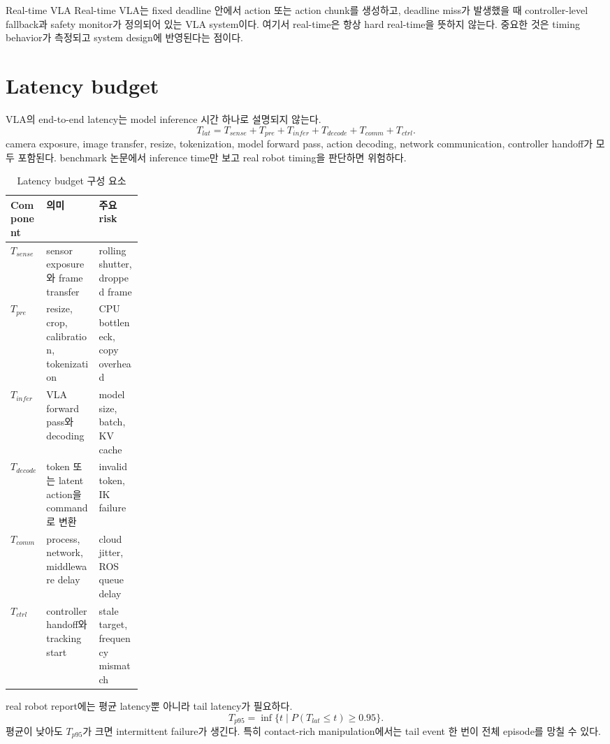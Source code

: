 \begin{definitionbox}{Real-time VLA}
Real-time VLA는 fixed deadline 안에서 action 또는 action chunk를 생성하고, deadline miss가 발생했을 때 controller-level fallback과 safety monitor가 정의되어 있는 VLA system이다. 여기서 real-time은 항상 hard real-time을 뜻하지 않는다. 중요한 것은 timing behavior가 측정되고 system design에 반영된다는 점이다.
\end{definitionbox}

\section{Latency budget}

VLA의 end-to-end latency는 model inference 시간 하나로 설명되지 않는다.
\begin{equation}
  T_{lat}
  =
  T_{sense}
  +
  T_{pre}
  +
  T_{infer}
  +
  T_{decode}
  +
  T_{comm}
  +
  T_{ctrl}.
  \label{eq:ch18-latency-budget}
\end{equation}
camera exposure, image transfer, resize, tokenization, model forward pass, action decoding, network communication, controller handoff가 모두 포함된다. benchmark 논문에서 inference time만 보고 real robot timing을 판단하면 위험하다.

\begin{table}[h]
  \centering
  \caption{Latency budget 구성 요소}
  \begin{tabularx}{\linewidth}{p{0.22\linewidth}X X}
    \toprule
    Component & 의미 & 주요 risk \\
    \midrule
    $T_{sense}$ & sensor exposure와 frame transfer & rolling shutter, dropped frame \\
    $T_{pre}$ & resize, crop, calibration, tokenization & CPU bottleneck, copy overhead \\
    $T_{infer}$ & VLA forward pass와 decoding & model size, batch, KV cache \\
    $T_{decode}$ & token 또는 latent action을 command로 변환 & invalid token, IK failure \\
    $T_{comm}$ & process, network, middleware delay & cloud jitter, ROS queue delay \\
    $T_{ctrl}$ & controller handoff와 tracking start & stale target, frequency mismatch \\
    \bottomrule
  \end{tabularx}
  \label{tab:ch18-latency-budget}
\end{table}

real robot report에는 평균 latency뿐 아니라 tail latency가 필요하다.
\begin{equation}
  T_{p95}
  =
  \inf
  \{t \mid P(T_{lat} \leq t) \geq 0.95\}.
  \label{eq:ch18-p95}
\end{equation}
평균이 낮아도 $T_{p95}$가 크면 intermittent failure가 생긴다. 특히 contact-rich manipulation에서는 tail event 한 번이 전체 episode를 망칠 수 있다.

